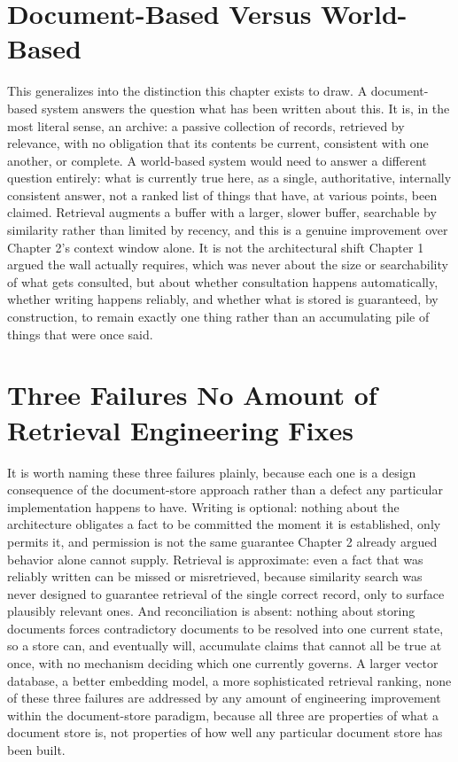 \section{Document-Based Versus World-Based}

This generalizes into the distinction this chapter exists to draw. A document-based system answers the question what has been written about this. It is, in the most literal sense, an archive: a passive collection of records, retrieved by relevance, with no obligation that its contents be current, consistent with one another, or complete. A world-based system would need to answer a different question entirely: what is currently true here, as a single, authoritative, internally consistent answer, not a ranked list of things that have, at various points, been claimed. Retrieval augments a buffer with a larger, slower buffer, searchable by similarity rather than limited by recency, and this is a genuine improvement over Chapter 2's context window alone. It is not the architectural shift Chapter 1 argued the wall actually requires, which was never about the size or searchability of what gets consulted, but about whether consultation happens automatically, whether writing happens reliably, and whether what is stored is guaranteed, by construction, to remain exactly one thing rather than an accumulating pile of things that were once said.

\section{Three Failures No Amount of Retrieval Engineering Fixes}

It is worth naming these three failures plainly, because each one is a design consequence of the document-store approach rather than a defect any particular implementation happens to have. Writing is optional: nothing about the architecture obligates a fact to be committed the moment it is established, only permits it, and permission is not the same guarantee Chapter 2 already argued behavior alone cannot supply. Retrieval is approximate: even a fact that was reliably written can be missed or misretrieved, because similarity search was never designed to guarantee retrieval of the single correct record, only to surface plausibly relevant ones. And reconciliation is absent: nothing about storing documents forces contradictory documents to be resolved into one current state, so a store can, and eventually will, accumulate claims that cannot all be true at once, with no mechanism deciding which one currently governs. A larger vector database, a better embedding model, a more sophisticated retrieval ranking, none of these three failures are addressed by any amount of engineering improvement within the document-store paradigm, because all three are properties of what a document store is, not properties of how well any particular document store has been built.

